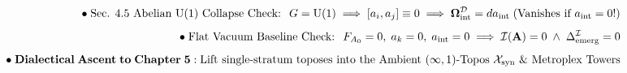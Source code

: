 \documentclass[preview]{standalone}
\begin{document}
\begin{align*}
\special{dvisvgm:raw <g id='unique000'>}\bullet\;\text{Sec. 4.5 Abelian }\mathrm{U}(1)\text{ Collapse Check: }\; G=\mathrm{U}(1) \implies [a_i, a_j]\equiv 0 \implies \mathbf{\Omega}_{\text{int}}^{\mathcal{D}} = da_{\text{int}}\;(\text{Vanishes if }a_{\text{int}}=0!)\\[4pt]\bullet\;\text{Flat Vacuum Baseline Check: }\; F_{A_0}=0,\; a_k=0,\; a_{\text{int}}=0 \implies \mathcal{I}(\mathbf{A})=0 \;\wedge\; \Delta_{\text{emerg}}^{\mathcal{I}} = 0\\[4pt]\bullet\;\mathbf{Dialectical\;Ascent\;to\;Chapter\;5:}\;\text{Lift single-stratum toposes into the Ambient }(\infty,1)\text{-Topos }\mathcal{X}_{\text{syn}}\text{ \& Metroplex Towers}\special{dvisvgm:raw </g>}
\end{align*}
\end{document}
